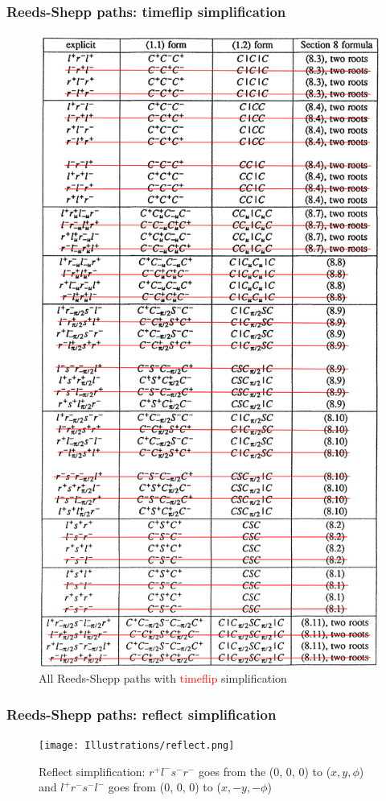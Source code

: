 \documentclass{beamer}
\begin{document}
\begin{frame}

\frametitle{Reeds-Shepp paths: timeflip simplification}

\begin{figure}
\centering
  \centering
  \includegraphics[width=0.4\linewidth]{Illustrations/ReedsSheppPossibilitiesNoTitleNoTimeflip.png}
  \caption{All Reeds-Shepp paths with \textcolor{red}{timeflip} simplification}
  \label{fig:sub1}
\end{figure}
\end{frame}

\begin{frame}

\frametitle{Reeds-Shepp paths: reflect simplification}

\begin{figure}
\centering
  \centering
  \texttt{[image: Illustrations/reflect.png]}
  \caption{Reflect simplification: $r^+l^-s^-r^-$ goes from the (0, 0, 0) to ($x, y, \phi$) and $l^+r^-s^-l^-$ goes from (0, 0, 0) to ($x,-y,-\phi$)}
  \label{fig:sub1}
\end{figure}
\end{frame}
\end{document}
